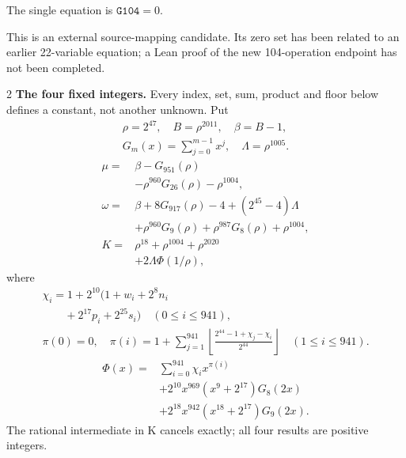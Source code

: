 \documentclass[10pt]{article}
\newcommand{\fl}[1]{\left\lfloor#1\right\rfloor}
\begin{document}
\noindent The single equation is $\boxed{\mathtt{G104}=0}$.
\par\medskip
This is an external source-mapping candidate. Its zero set has been related to
an earlier 22-variable equation; a Lean proof of the new 104-operation endpoint
has not been completed.
\bigskip
\begin{multicols}{2}\fontsize{7.7}{8.2}\selectfont
\textbf{The four fixed integers.}
Every index, set, sum, product and floor below defines a constant, not
another unknown. Put
\[
\begin{gathered}
\rho=2^{47},\quad B=\rho^{2011},\quad\beta=B-1,\\
G_m(x)=\sum_{j=0}^{m-1}x^j,\quad
\Lambda=\rho^{1005}.
\end{gathered}
\]
\begin{align*}
\mu={}&\beta-G_{951}(\rho)\\
&-\rho^{960}G_{26}(\rho)-\rho^{1004},\\
\omega={}&\beta+8G_{917}(\rho)-4+(2^{45}-4)\Lambda\\
&+\rho^{960}G_9(\rho)+\rho^{987}G_8(\rho)
  +\rho^{1004},\\
K={}&\rho^{18}+\rho^{1004}+\rho^{2020}\\
&+2\Lambda\Phi(1/\rho),
\end{align*}
where
\[
\begin{gathered}
\chi_i=1+2^{10}(1+w_i+2^8n_i\\
\qquad+2^{17}p_i+2^{25}s_i)\quad(0\le i\le941),\\
\pi(0)=0,\quad\pi(i)=1+\sum_{j=1}^{941}
\fl{\frac{2^{44}-1+\chi_j-\chi_i}{2^{44}}}\quad(1\le i\le941).
\end{gathered}
\]
\[
\begin{split}
\Phi(x)={}&\sum_{i=0}^{941}\chi_i x^{\pi(i)}\\
&+2^{10}x^{969}(x^9+2^{17})G_8(2x)\\
&+2^{18}x^{942}(x^{18}+2^{17})G_9(2x).
\end{split}
\]
The rational intermediate in K cancels exactly; all four results are positive integers.


\end{multicols}
\end{document}
